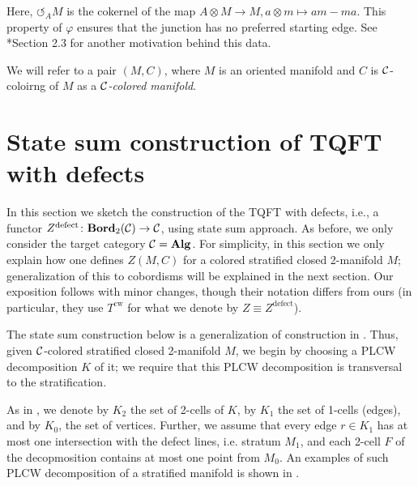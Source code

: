 \begin{defectfiguresetup}
\begin{definition}
\begin{itemize}
    		 Here, $\circlearrowleft_{A} M$ is the cokernel of the map $A \otimes M
    		 \rightarrow M, a \otimes m \mapsto am - ma$. This property of
    		 $\varphi$ ensures that the junction has no preferred starting edge.
    		 See *{Section 2.3} for another motivation behind
    		 this data.
  \end{itemize}
  We will refer to a pair $(M, C)$, where $M$ is an oriented manifold and $C$
  is $\mathcal{C}$-coloirng of $M$ as a \emph{$\mathcal{C}$-colored
  manifold}.
\end{definition}

\section{State sum construction of TQFT with defects}\label{s:defect-statesum}

In this section we sketch the construction of the TQFT with defects, i.e., a
functor $Z^{\mathrm{defect}}\colon \mathbf{Bord}_2(\mathcal{C})\to \mathcal{C}$, using state sum
approach.  As before, we only consider the target category $\mathcal{C}=\mathbf{Alg}$. For
simplicity, in this section we only explain how one defines $Z(M,C)$ for a
colored stratified closed 2-manifold $M$; generalization of this to cobordisms
will be explained in the next section. Our exposition follows  with
minor changes, though their notation differs from ours (in particular, they use
$T^{\mathrm{cw}}$ for what we denote by $Z\equiv Z^{\mathrm{defect}}$).

The state sum construction below is a generalization of construction in
. Thus, given $\mathcal{C}$-colored stratified closed 2-manifold
$M$, we begin by choosing a PLCW decomposition $K$ of it; we require that this
PLCW decomposition is transversal to the stratification.


As in , we denote by $K_2$ the set of 2-cells of $K$, by
$K_1$ the set of 1-cells (edges), and by  $K_0$, the set of vertices. Further,
we assume that every edge $r\in K_1$ has at most one intersection with the
defect lines, i.e. stratum $M_1$, and each 2-cell $F$ of the decopmosition
contains at most one point from $M_0$. An examples of such PLCW decomposition
of a stratified manifold is shown in .




\end{defectfiguresetup}
